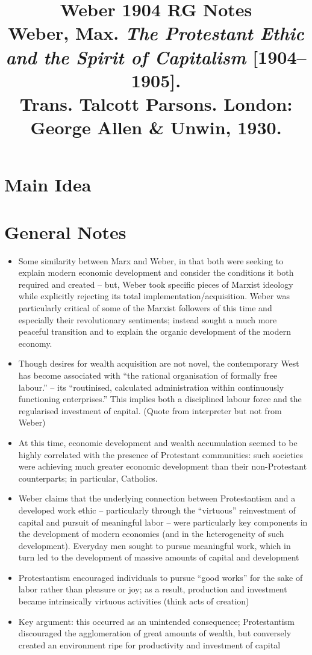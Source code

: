 \documentclass[12pt]{article}
\title{\textbf{Weber 1904 RG Notes}\\
\large Weber, Max. \textit{The Protestant Ethic and the Spirit of Capitalism} [1904--1905].\\
Trans. Talcott Parsons. London: George Allen \& Unwin, 1930.}
\author{}
\date{}
\begin{document}
\maketitle

\section{Main Idea}



\section{General Notes}

\begin{itemize}[leftmargin=*, itemsep=4pt]
    \item Some similarity between Marx and Weber, in that both were seeking to explain modern economic development and consider the conditions it both required and created -- but, Weber took specific pieces of Marxist ideology while explicitly rejecting its total implementation/acquisition. Weber was particularly critical of some of the Marxist followers of this time and especially their revolutionary sentiments; instead sought a much more peaceful transition and to explain the organic development of the modern economy.
    \item Though desires for wealth acquisition are not novel, the contemporary West has become associated with ``the rational organisation of formally free labour.'' -- its ``routinised, calculated administration within continuously functioning enterprises.'' This implies both a disciplined labour force and the regularised investment of capital. (Quote from interpreter but not from Weber)
    \item At this time, economic development and wealth accumulation seemed to be highly correlated with the presence of Protestant communities: such societies were achieving much greater economic development than their non-Protestant counterparts; in particular, Catholics.
    \item Weber claims that the underlying connection between Protestantism and a developed work ethic -- particularly through the ``virtuous'' reinvestment of capital and pursuit of meaningful labor -- were particularly key components in the development of modern economies (and in the heterogeneity of such development). Everyday men sought to pursue meaningful work, which in turn led to the development of massive amounts of capital and development
    \item Protestantism encouraged individuals to pursue ``good works'' for the sake of labor rather than pleasure or joy; as a result, production and investment became intrinsically virtuous activities (think acts of creation)
    \item Key argument: this occurred as an unintended consequence; Protestantism discouraged the agglomeration of great amounts of wealth, but conversely created an environment ripe for productivity and investment of capital
\end{itemize}
\end{document}
